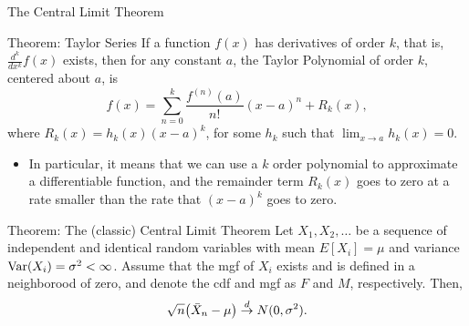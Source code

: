 \begin{frame}[allowframebreaks]{The Central Limit Theorem}
  \begin{block}{Theorem: Taylor Series}
    If a function $f(x)$ has derivatives of order $k$, that is, $\frac{d^k}{dx^k} f(x)$ exists, then for any constant $a$, the \alert{Taylor Polynomial} of order $k$, centered about $a$, is
    $$
    f(x) = \sum_{n = 0}^k \frac{f^{(n)}(a)}{n!}(x - a)^n + R_k(x),
    $$
    where $R_k(x) = h_k(x)(x - a)^k$, for some $h_k$ such that $\lim_{x \rightarrow a} h_k(x) = 0$.
  \end{block}
  
  \begin{itemize}
    \item In particular, it means that we can use a $k$ order polynomial to approximate a differentiable function, and the remainder term $R_k(x)$ goes to zero at a rate smaller than the rate that $(x - a)^k$ goes to zero.
  \end{itemize}
  
  \begin{block}{Theorem: The (classic) Central Limit Theorem}
    Let $X_1, X_2, \ldots$ be a sequence of independent and identical random variables with mean $E[X_i] = \mu$ and variance $\mathrm{Var}(X_i) = \sigma^2 < \infty$.
    Assume that the mgf of $X_i$ exists and is defined in a neighborood of zero, and denote the cdf and mgf as $F$ and $M$, respectively. Then,
    $$
    \sqrt{n}\big(\bar{X}_n - \mu\big) \overset{d}{\rightarrow} N(0, \sigma^2). 
    $$
    
\end{block}
\end{frame}
